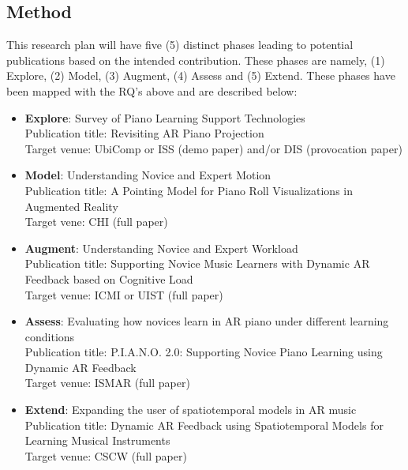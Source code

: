 \documentclass[manuscript,screen]{acmart}
\begin{document}
\subsection{Method}
This research plan will have five (5) distinct phases leading to potential publications based on the intended contribution. These phases are namely, (1) Explore, (2) Model, (3) Augment, (4) Assess and (5) Extend. These phases have been mapped with the RQ's above and are described below: 
\begin{itemize}
    \item \textbf{Explore}: Survey of Piano Learning Support Technologies\\
    Publication title: Revisiting AR Piano Projection\\
    Target venue: UbiComp or ISS (demo paper) and/or DIS (provocation paper)
    \item \textbf{Model}: Understanding Novice and Expert Motion\\
    Publication title: A Pointing Model for Piano Roll Visualizations in Augmented Reality\\
    Target vene: CHI (full paper)
    \item \textbf{Augment}: Understanding Novice and Expert Workload\\
    Publication title: Supporting Novice Music Learners with Dynamic AR Feedback based on Cognitive Load\\
    Target venue: ICMI or UIST (full paper)
    \item \textbf{Assess}: Evaluating how novices learn in AR piano under different learning conditions\\
    Publication title: P.I.A.N.O. 2.0: Supporting Novice Piano Learning using Dynamic AR Feedback\\
    Target venue: ISMAR (full paper)
    \item \textbf{Extend}: Expanding the user of spatiotemporal models in AR music\\
    Publication title: Dynamic AR Feedback using Spatiotemporal Models for Learning Musical Instruments\\
    Target venue: CSCW (full paper)
\end{itemize}
\end{document}
